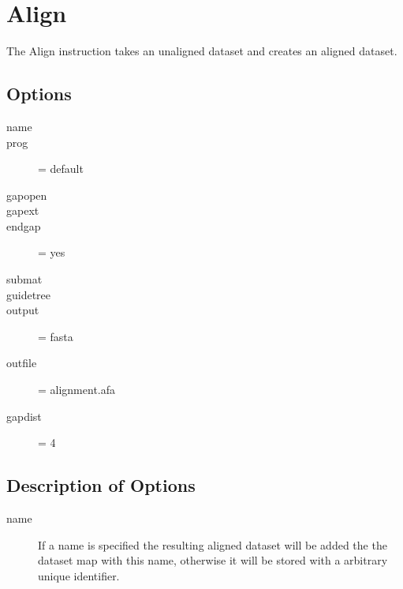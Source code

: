 \section{Align}
	The Align instruction takes an unaligned dataset and creates an aligned dataset.
\subsection{Options}
\begin{description}
\item[name] 
\item[prog] = default
\item[gapopen]
\item[gapext]
\item[endgap] = yes
\item[submat]
\item[guidetree]
\item[output] = fasta
\item[outfile] = alignment.afa
\item[gapdist] = 4
\end{description}

\subsection{Description of Options}
\begin{description}
\item[name] If a name is specified the resulting aligned dataset will be added the the dataset map with this name, otherwise it will be stored with a arbitrary unique identifier.
\end{description}
